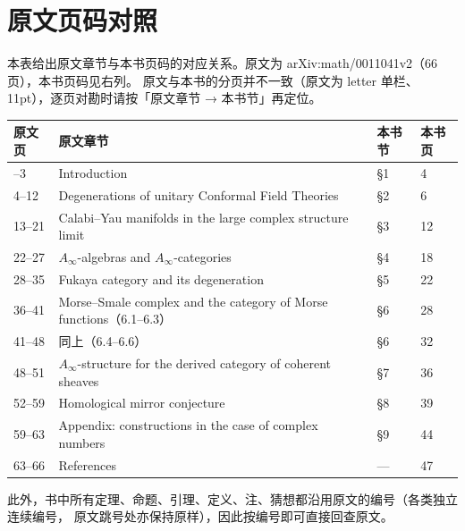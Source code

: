 \section{原文页码对照}

本表给出原文章节与本书页码的对应关系。原文为 arXiv:math/0011041v2（66 页），本书页码见右列。
原文与本书的分页并不一致（原文为 letter 单栏、11pt），逐页对勘时请按「原文章节 → 本书节」再定位。

\begin{center}
\begin{longtable}{@{}p{}p{}p{}p{}@{}}
\toprule
\textbf{原文页} & \textbf{原文章节} & \textbf{本书节} & \textbf{本书页} \\
\midrule
\endhead
\bottomrule
\endfoot
1--3   & Introduction & \S1 & 4 \\
4--12   & Degenerations of unitary Conformal Field Theories & \S2 & 6 \\
13--21   & Calabi--Yau manifolds in the large complex structure limit & \S3 & 12 \\
22--27   & $A_\infty$-algebras and $A_\infty$-categories & \S4 & 18 \\
28--35   & Fukaya category and its degeneration & \S5 & 22 \\
36--41   & Morse--Smale complex and the category of Morse functions（6.1--6.3） & \S6 & 28 \\
41--48   & 同上（6.4--6.6） & \S6 & 32 \\
48--51   & $A_\infty$-structure for the derived category of coherent sheaves & \S7 & 36 \\
52--59   & Homological mirror conjecture & \S8 & 39 \\
59--63   & Appendix: constructions in the case of complex numbers & \S9 & 44 \\
63--66   & References & --- & 47 \\
\end{longtable}
\end{center}

此外，书中所有定理、命题、引理、定义、注、猜想都沿用原文的编号（各类独立连续编号，
原文跳号处亦保持原样），因此按编号即可直接回查原文。
